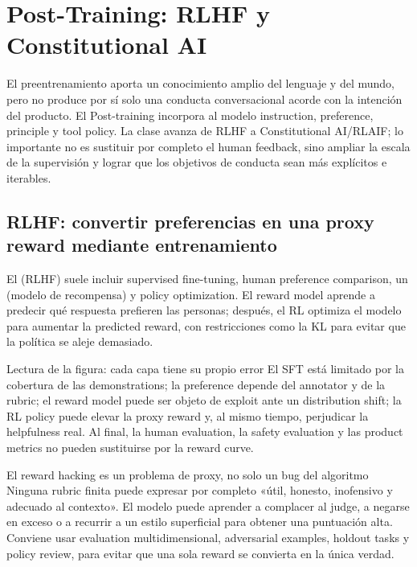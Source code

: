 \section{Post-Training: RLHF y Constitutional AI}

El preentrenamiento aporta un conocimiento amplio del lenguaje y del mundo, pero no produce por sí solo una conducta conversacional acorde con la intención del producto. El Post-training incorpora al modelo instruction, preference, principle y tool policy. La clase avanza de RLHF a Constitutional AI/RLAIF; lo importante no es sustituir por completo el human feedback, sino ampliar la escala de la supervisión y lograr que los objetivos de conducta sean más explícitos e iterables.

\subsection{RLHF: convertir preferencias en una proxy reward mediante entrenamiento}

El  (RLHF) suele incluir supervised fine-tuning, human preference comparison, un  (modelo de recompensa) y policy optimization. El reward model aprende a predecir qué respuesta prefieren las personas; después, el RL optimiza el modelo para aumentar la predicted reward, con restricciones como la KL para evitar que la política se aleje demasiado.


\begin{knowledgebox}{Lectura de la figura: cada capa tiene su propio error}
El SFT está limitado por la cobertura de las demonstrations; la preference depende del annotator y de la rubric; el reward model puede ser objeto de exploit ante un distribution shift; la RL policy puede elevar la proxy reward y, al mismo tiempo, perjudicar la helpfulness real. Al final, la human evaluation, la safety evaluation y las product metrics no pueden sustituirse por la reward curve.
\end{knowledgebox}

\begin{warningbox}{El reward hacking es un problema de proxy, no solo un bug del algoritmo}
Ninguna rubric finita puede expresar por completo «útil, honesto, inofensivo y adecuado al contexto». El modelo puede aprender a complacer al judge, a negarse en exceso o a recurrir a un estilo superficial para obtener una puntuación alta. Conviene usar evaluation multidimensional, adversarial examples, holdout tasks y policy review, para evitar que una sola reward se convierta en la única verdad.
\end{warningbox}

